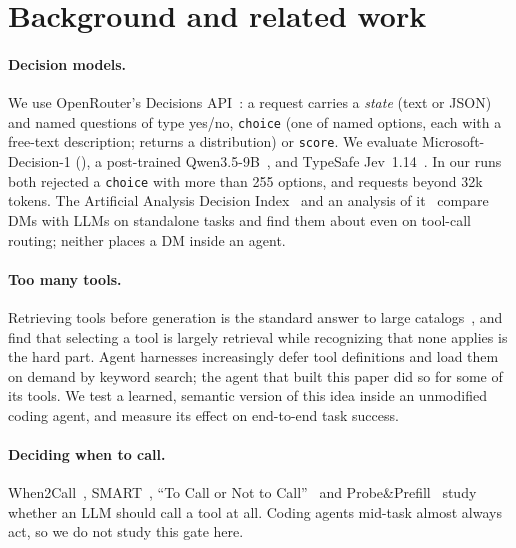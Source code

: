 \section{Background and related work}\label{sec:background}

\paragraph{Decision models.} We use OpenRouter's Decisions API~\citep{openrouterdecisions}: a request carries a
\emph{state} (text or JSON) and named questions of type yes/no, \texttt{choice} (one of named options, each
with a free-text description; returns a distribution) or \texttt{score}. We evaluate
Microsoft-Decision-1 (\msd{}), a post-trained Qwen3.5-9B~\citep{msd1}, and TypeSafe Jev~1.14~\citep{typesafejev}.
In our runs both rejected a \texttt{choice} with more than 255 options, and \msd{} requests beyond 32k tokens.
The Artificial Analysis Decision Index~\citep{aa2026decisionindex} and an analysis of it~\citep{olson2026decision}
compare DMs with LLMs on standalone tasks and find them about even on tool-call routing; neither places a DM
inside an agent.

\paragraph{Too many tools.} Retrieving tools before generation is the standard answer to large
catalogs~\citep{qin2023toolllm,oats2026}, and \citet{selection2026retrieval} find that selecting a tool is
largely retrieval while recognizing that none applies is the hard part. Agent harnesses increasingly defer
tool definitions and load them on demand by keyword search; the agent that built this paper did so for some
of its tools. We test a learned, semantic version of this idea inside an unmodified coding agent, and measure
its effect on end-to-end task success.

\paragraph{Deciding when to call.} When2Call~\citep{ross2025when2call}, SMART~\citep{qian2025smart}, ``To Call or
Not to Call''~\citep{tocall2026} and Probe\&Prefill~\citep{sun2026probe} study whether an LLM should call a tool at
all. Coding agents mid-task almost always act, so we do not study this gate here.

